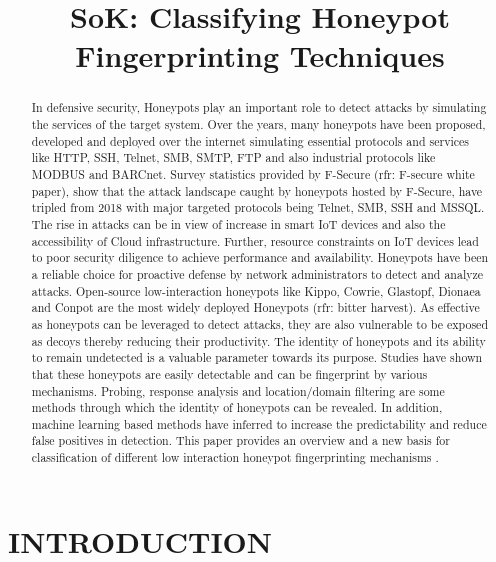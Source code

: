 \documentclass[letterpaper, 10 pt, conference]{ieeeconf}  %
\title{\LARGE \bf
SoK: Classifying Honeypot Fingerprinting Techniques
}
\begin{document}
\maketitle
\thispagestyle{empty}
\pagestyle{empty}


\begin{abstract}
In defensive security, Honeypots play an important role to detect attacks by simulating the services of the target system. Over the years, many honeypots have been proposed, developed and deployed over the internet simulating essential protocols and services like HTTP, SSH, Telnet, SMB, SMTP, FTP and also industrial protocols like MODBUS and BARCnet. Survey statistics provided by F-Secure (rfr: F-secure white paper), show that the attack landscape caught by honeypots hosted by F-Secure, have tripled from 2018 with major targeted protocols being Telnet, SMB, SSH and  MSSQL. The rise in attacks can be in view of increase in smart IoT devices and also the accessibility of Cloud infrastructure. Further, resource constraints on IoT devices lead to poor security diligence to achieve performance and availability. Honeypots have been a reliable choice for proactive defense by  network administrators to detect and analyze attacks. Open-source low-interaction honeypots like Kippo, Cowrie, Glastopf, Dionaea and Conpot are the most widely deployed Honeypots (rfr: bitter harvest). As effective as  honeypots can be leveraged to detect attacks, they are also vulnerable to be exposed as decoys thereby reducing their productivity. The identity of honeypots and its ability to remain undetected is a valuable parameter towards its purpose. Studies have shown that these honeypots are easily detectable and can be fingerprint by various mechanisms. Probing, response analysis and  location/domain filtering are some methods through which the identity of honeypots can be revealed. In addition, machine learning based methods have inferred to increase the predictability and reduce false positives in detection. This paper provides an overview and a new basis for classification of different low interaction honeypot fingerprinting mechanisms . 
\end{abstract}


\section{INTRODUCTION}
\end{document}
